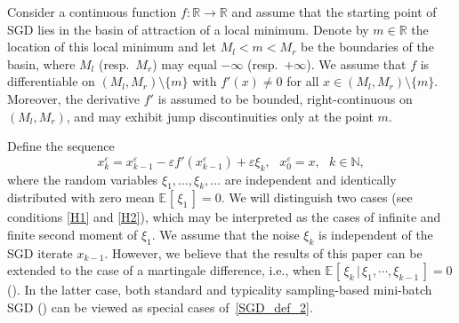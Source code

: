 \documentclass{article}
\theoremstyle{plain}
\theoremstyle{definition}
\theoremstyle{remark}
\newcommand{\e}[2][]{{\mathbb{E}_{#1}\left[ \, #2 \,\right] }} %
\begin{document}
Consider a continuous function $f \colon \mathbb{R} \to \mathbb{R}$ and assume that the starting point of SGD lies in the basin of attraction of a local minimum. Denote by $m \in \mathbb{R}$ the location of this local minimum and let $M_l < m < M_r$ be the boundaries of the basin, where $M_l$ (resp.\ $M_r$) may equal $-\infty$ (resp.\ $+\infty$). We assume that $f$ is differentiable on $(M_l, M_r) \setminus \{m\}$ with $f'(x) \neq 0$ for all $x \in (M_l, M_r) \setminus \{m\}$. Moreover, the derivative $f'$ is assumed to be bounded, right-continuous on $(M_l, M_r)$, and may exhibit jump discontinuities only at the point $m$.

Define the sequence
\begin{equation}\label{SGD_def_2}
x_k^{\varepsilon}=x_{k-1}^{\varepsilon}-\varepsilon f'(x_{k-1}^{\varepsilon})+\varepsilon \xi_k, \ \ \ x_0^{\varepsilon}=x, \ \ \ k\in \mathbb{N},
\end{equation}
where the random variables $\xi_1,\dots,\xi_k,\dots$ are independent and identically distributed  with zero mean $\e{\xi_1}=0$.
We will distinguish two cases (see conditions \ref{H1} and \ref{H2}), which may be interpreted as the cases of infinite and finite second moment of $\xi_1$.
We assume that the noise $\xi_k$ is independent of the SGD iterate $x_{k-1}$. However, we believe that the results of this paper can be extended to the case of a martingale difference, i.e., when  $\e{\xi_k\,|\, \xi_1,\cdots,\xi_{k-1}} = 0$ (\citet{lauand2024}). In the latter case, both standard and typicality sampling-based mini-batch SGD (\citet{peng2019}) can be viewed as special cases of~\eqref{SGD_def_2}.
\end{document}
